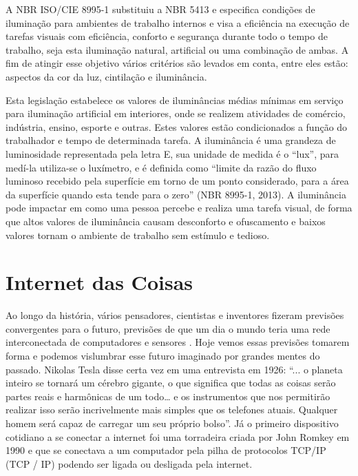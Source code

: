 A NBR ISO/CIE 8995-1 \cite{normabr} substituiu a NBR 5413 e especifica condições de iluminação para ambientes de trabalho internos e visa a eficiência na execução de tarefas visuais com eficiência, conforto e segurança durante todo o tempo de trabalho, seja esta iluminação natural, artificial ou uma combinação de ambas. A fim de atingir esse objetivo vários critérios são levados em conta, entre eles estão: aspectos da cor da luz, cintilação e iluminância.

Esta legislação estabelece os valores de iluminâncias médias mínimas em serviço para iluminação artificial em interiores, onde se realizem atividades de comércio, indústria, ensino, esporte e outras. Estes valores estão condicionados a função do trabalhador e tempo de determinada tarefa. A iluminância é uma grandeza de luminosidade representada pela letra E, sua unidade de medida é o “lux”, para medí-la utiliza-se o luxímetro, e é definida como  ``limite da razão do fluxo luminoso recebido pela superfície em torno de um ponto considerado, para a área da superfície quando esta tende para o zero'' (NBR 8995-1, 2013).  A iluminância pode impactar em como uma pessoa percebe e realiza uma tarefa visual, de forma que altos valores de iluminância causam desconforto e ofuscamento e baixos valores tornam o ambiente de trabalho sem estímulo e tedioso.


\section{Internet das Coisas}

Ao longo da história, vários pensadores, cientistas e inventores fizeram previsões convergentes para o futuro, previsões de que um dia o mundo teria uma rede interconectada de computadores e sensores \cite{tesla}. Hoje vemos essas previsões tomarem forma e podemos vislumbrar esse futuro imaginado por grandes mentes do passado. Nikolas Tesla disse certa vez em uma entrevista em 1926: ``... o planeta inteiro se tornará um cérebro gigante, o que significa que todas as coisas serão partes reais e harmônicas de um todo… e os instrumentos que nos permitirão realizar isso serão incrivelmente mais simples que os telefones atuais. Qualquer homem será capaz de carregar um seu próprio bolso''. Já o primeiro dispositivo cotidiano a se conectar a internet foi uma torradeira criada por John Romkey em 1990 e que se conectava a um computador pela pilha de protocolos TCP/IP (\acl{TCP} / \acl{IP}) podendo ser ligada ou desligada pela internet.

